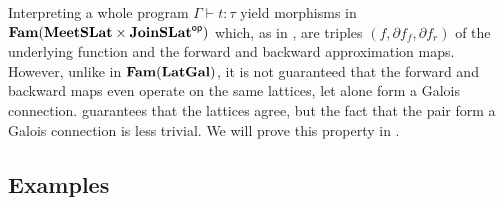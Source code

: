 Interpreting a whole program $\Gamma \vdash t : \tau$ yield morphisms in
$\mathbf{Fam}(\mathbf{MeetSLat} \times \mathbf{JoinSLat}^{\mathsf{op}})$ which, as in , are triples
$(f, \partial f_f, \partial f_r)$ of the underlying function and the forward and backward approximation
maps. However, unlike in $\mathbf{Fam}(\mathbf{LatGal})$, it is not guaranteed that the forward and backward maps even operate on
the same lattices, let alone form a Galois connection.  guarantees that
the lattices agree, but the fact that the pair form a Galois connection is less trivial. We will prove this
property in .



\subsection{Examples}

